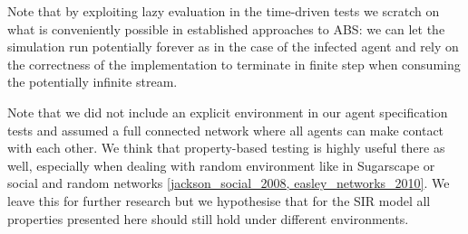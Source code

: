 Note that by exploiting lazy evaluation in the time-driven tests we scratch on what is conveniently possible in established approaches to ABS: we can let the simulation run potentially forever as in the case of the infected agent and rely on the correctness of the implementation to terminate in finite step when consuming the potentially infinite stream.

Note that we did not include an explicit environment in our agent specification tests and assumed a full connected network where all agents can make contact with each other. We think that property-based testing is highly useful there as well, especially when dealing with random environment like in Sugarscape or social and random networks \ref{jackson_social_2008, easley_networks_2010}. We leave this for further research but we hypothesise that for the SIR model all properties presented here should still hold under different environments.
